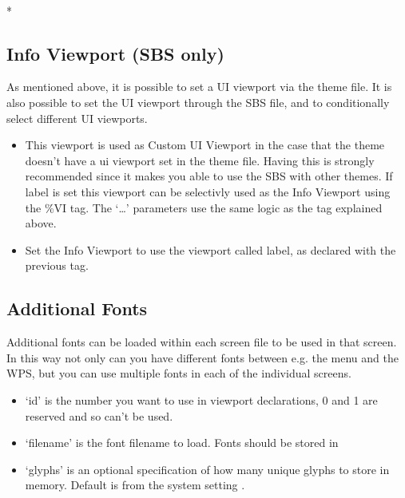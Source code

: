 \\*


\subsection{Info Viewport (SBS only)}
As mentioned above, it is possible to set a UI viewport via the theme
 file. It is also possible to set the UI viewport through the SBS
file, and to conditionally select different UI viewports.

  \begin{itemize}
    \item {}
    This viewport is used as Custom UI Viewport in the case that the theme
    doesn't have a ui viewport set in the theme  file. Having this
    is strongly recommended since it makes you able to use the SBS
    with other themes. If label is set this viewport can be selectivly used as the
    Info Viewport using the \%VI tag. The `\dots' parameters use the same logic as
    the  tag explained above.

    \item {} Set the Info Viewport to use the viewport called
    label, as declared with the previous tag.
  \end{itemize}

\subsection{\label{ref:multifont}Additional Fonts}
Additional fonts can be loaded within each screen file to be used in that
screen. In this way not only can you have different fonts between e.g. the menu
and the WPS, but you can use multiple fonts in each of the individual screens.\\


  \begin{itemize}
    \item `id' is the number you want to use in viewport declarations, 0 and 1
       are reserved and so can't be used.
    \item `filename' is the font filename to load. Fonts should be stored in
    \item `glyphs' is an optional specification of how many unique glyphs to
       store in memory. Default is from the system setting
       .
  \end{itemize}

